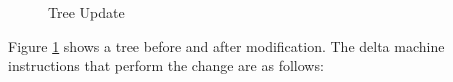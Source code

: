 %
\begin{figure}


\caption{Tree Update\label{fig:Tree-Update}}

\end{figure}


Figure \ref{fig:Tree-Update} shows a tree before and after modification.
The delta machine instructions that perform the change are as follows:

